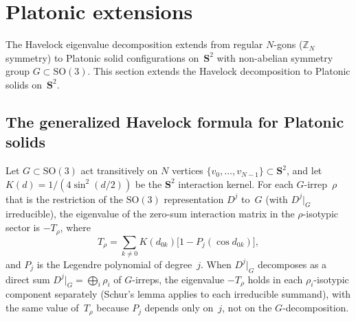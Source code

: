 \section{Platonic extensions}
\label{sec:platonic}

The Havelock eigenvalue decomposition extends from regular $N$-gons
($\mathbb{Z}_N$ symmetry) to Platonic solid configurations on~$\mathbf{S}^2$
with non-abelian symmetry group $G \subset \mathrm{SO}(3)$.
This section extends the Havelock decomposition to Platonic solids
on~$\mathbf{S}^2$.

\subsection{The generalized Havelock formula for Platonic solids}
\label{sec:platonic-havelock}

\begin{theorem}\label{thm:platonic-havelock}
Let $G \subset \mathrm{SO}(3)$ act transitively on $N$ vertices
$\{v_0, \ldots, v_{N-1}\} \subset \mathbf{S}^2$, and let
$K(d) = 1/(4\sin^2(d/2))$ be the $\mathbf{S}^2$ interaction kernel.
For each $G$-irrep~$\rho$ that is the restriction of the $\mathrm{SO}(3)$
representation $D^j$ to~$G$ (with $D^j|_G$ irreducible), the eigenvalue
of the zero-sum interaction matrix in the $\rho$-isotypic sector is
$-T_\rho$, where
\begin{equation}\label{eq:platonic-havelock}
  T_\rho = \sum_{k \neq 0} K(d_{0k})\bigl[1 - P_j(\cos d_{0k})\bigr],
\end{equation}
and $P_j$ is the Legendre polynomial of degree~$j$.
When $D^j|_G$ decomposes as a direct sum
$D^j|_G = \bigoplus_i \rho_i$ of $G$-irreps, the eigenvalue
$-T_\rho$ holds in each $\rho_i$-isotypic component
separately (Schur's lemma applies to each irreducible
summand), with the same value of~$T_\rho$ because $P_j$
depends only on~$j$, not on the $G$-decomposition.
\end{theorem}

